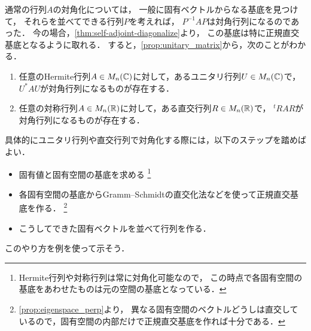 通常の行列$A$の対角化については，
一般に固有ベクトルからなる基底を見つけて，
それらを並べてできる行列$P$を考えれば，
$P^{-1}AP$は対角行列になるのであった．
今の場合，\cref{thm:self-adjoint-diagonalize}より，
この基底は特に正規直交基底となるように取れる．
すると，\cref{prop:unitary_matrix}から，次のことがわかる．
\begin{thm}
  \begin{enumerate}
      \item 任意のHermite行列$A \in M_n(\mathbb{C})$に対して，あるユニタリ行列$U \in M_n(\mathbb{C})$で，
      $U^\ast A U$が対角行列になるものが存在する．
      \item 任意の対称行列$A \in M_n(\mathbb{R})$に対して，ある直交行列$R \in M_n(\mathbb{R})$で，
      ${}^tR A R$が対角行列になるものが存在する．
  \end{enumerate}
\end{thm}
具体的にユニタリ行列や直交行列で対角化する際には，以下のステップを踏めばよい．
\begin{itemize}
    \item 固有値と固有空間の基底を求める
    \footnote{
    Hermite行列や対称行列は常に対角化可能なので，
    この時点で各固有空間の基底をあわせたものは元の空間の基底となっている．}
    \item 各固有空間の基底からGramm--Schmidtの直交化法などを使って正規直交基底を作る．
    \footnote{
    \cref{prop:eigenspace_perp}より，
    異なる固有空間のベクトルどうしは直交しているので，固有空間の内部だけで正規直交基底を作れば十分である．
    }
    \item こうしてできた固有ベクトルを並べて行列を作る．
\end{itemize}
このやり方を例を使って示そう．
